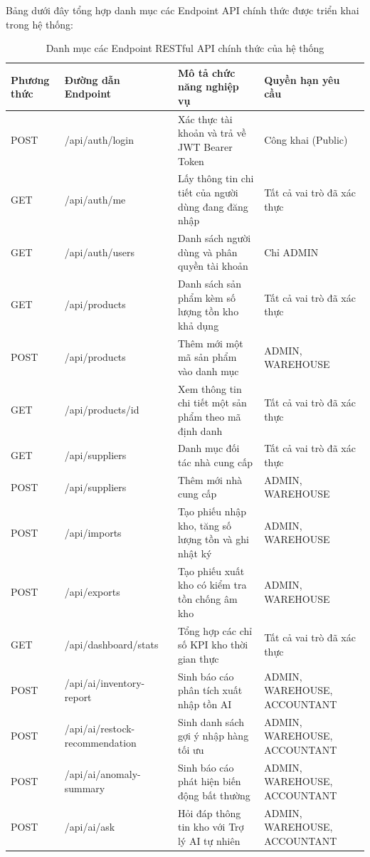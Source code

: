 Bảng dưới đây tổng hợp danh mục các Endpoint API chính thức được triển khai trong hệ thống:

\begin{table}[h!]
\centering
\caption{Danh mục các Endpoint RESTful API chính thức của hệ thống}
\begin{tabular}{|l|l|l|l|}
\hline
\rowcolor{tablehead}
\textbf{Phương thức} & \textbf{Đường dẫn Endpoint} & \textbf{Mô tả chức năng nghiệp vụ} & \textbf{Quyền hạn yêu cầu} \\ \hline
POST & /api/auth/login & Xác thực tài khoản và trả về JWT Bearer Token & Công khai (Public) \\ \hline
GET & /api/auth/me & Lấy thông tin chi tiết của người dùng đang đăng nhập & Tất cả vai trò đã xác thực \\ \hline
GET & /api/auth/users & Danh sách người dùng và phân quyền tài khoản & Chỉ ADMIN \\ \hline
GET & /api/products & Danh sách sản phẩm kèm số lượng tồn kho khả dụng & Tất cả vai trò đã xác thực \\ \hline
POST & /api/products & Thêm mới một mã sản phẩm vào danh mục & ADMIN, WAREHOUSE \\ \hline
GET & /api/products/{id} & Xem thông tin chi tiết một sản phẩm theo mã định danh & Tất cả vai trò đã xác thực \\ \hline
GET & /api/suppliers & Danh mục đối tác nhà cung cấp & Tất cả vai trò đã xác thực \\ \hline
POST & /api/suppliers & Thêm mới nhà cung cấp & ADMIN, WAREHOUSE \\ \hline
POST & /api/imports & Tạo phiếu nhập kho, tăng số lượng tồn và ghi nhật ký & ADMIN, WAREHOUSE \\ \hline
POST & /api/exports & Tạo phiếu xuất kho có kiểm tra tồn chống âm kho & ADMIN, WAREHOUSE \\ \hline
GET & /api/dashboard/stats & Tổng hợp các chỉ số KPI kho thời gian thực & Tất cả vai trò đã xác thực \\ \hline
POST & /api/ai/inventory-report & Sinh báo cáo phân tích xuất nhập tồn AI & ADMIN, WAREHOUSE, ACCOUNTANT \\ \hline
POST & /api/ai/restock-recommendation & Sinh danh sách gợi ý nhập hàng tối ưu & ADMIN, WAREHOUSE, ACCOUNTANT \\ \hline
POST & /api/ai/anomaly-summary & Sinh báo cáo phát hiện biến động bất thường & ADMIN, WAREHOUSE, ACCOUNTANT \\ \hline
POST & /api/ai/ask & Hỏi đáp thông tin kho với Trợ lý AI tự nhiên & ADMIN, WAREHOUSE, ACCOUNTANT \\ \hline
\end{tabular}
\end{table}

